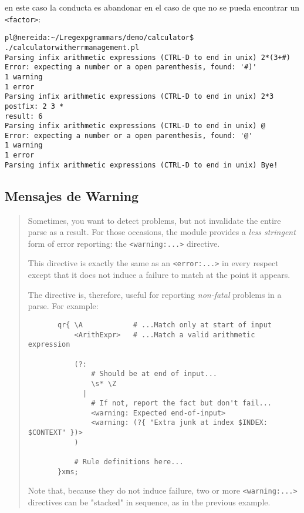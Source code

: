 en este caso la conducta es abandonar en el caso de que no se pueda encontrar un \verb|<factor>|:
\begin{verbatim}
pl@nereida:~/Lregexpgrammars/demo/calculator$ ./calculatorwitherrmanagement.pl
Parsing infix arithmetic expressions (CTRL-D to end in unix) 2*(3+#)
Error: expecting a number or a open parenthesis, found: '#)'
1 warning
1 error
Parsing infix arithmetic expressions (CTRL-D to end in unix) 2*3
postfix: 2 3 *
result: 6
Parsing infix arithmetic expressions (CTRL-D to end in unix) @
Error: expecting a number or a open parenthesis, found: '@'
1 warning
1 error
Parsing infix arithmetic expressions (CTRL-D to end in unix) Bye!
\end{verbatim}

\subsection{Mensajes de Warning}

\begin{it}\begin{quotation}
   Sometimes, you want to detect problems, but not invalidate the entire
   parse as a result. For those occasions, the module provides a \emph{less
   stringent} form of error reporting: the \verb"<warning:...>" directive.

   This directive is exactly the same as an \verb"<error:...>" in every respect
   except that it does not induce a failure to match at the point it
   appears.

   The directive is, therefore, useful for reporting \emph{non-fatal} problems
   in a parse. For example:

\begin{verbatim}
       qr{ \A            # ...Match only at start of input
           <ArithExpr>   # ...Match a valid arithmetic expression

           (?:
               # Should be at end of input...
               \s* \Z
             |
               # If not, report the fact but don't fail...
               <warning: Expected end-of-input>
               <warning: (?{ "Extra junk at index $INDEX: $CONTEXT" })>
           )

           # Rule definitions here...
       }xms;
\end{verbatim}

   Note that, because they do not induce failure, two or more
   \verb"<warning:...>" directives can be "stacked" in sequence, as in the
   previous example.

\end{quotation}\end{it}

